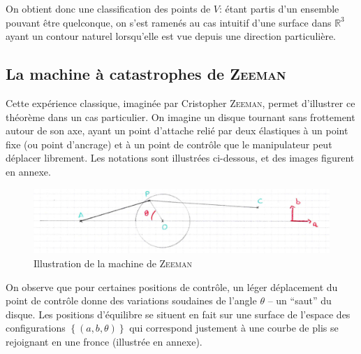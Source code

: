 \documentclass[a4paper]{article}
\newcommand{\R}{\mathbb{R}}
\theoremstyle{definition}
\begin{document}
On obtient donc une classification des points de $V$: étant partis d'un ensemble pouvant être quelconque, on s'est ramenés au cas intuitif d'une surface dans $\R^3$ ayant un contour naturel lorsqu'elle est vue depuis une direction particulière.

\subsection{La machine à catastrophes de \textsc{Zeeman}}
Cette expérience classique, imaginée par Cristopher \textsc{Zeeman}, permet d'illustrer ce théorème dans un cas particulier.
On imagine un disque tournant sans frottement autour de son axe, ayant un point d'attache relié par deux élastiques à un point fixe (ou point d'ancrage) et à un point de contrôle que le manipulateur peut déplacer librement.
Les notations sont illustrées ci-dessous, et des images figurent en annexe.

\begin{figure}[H]\centering \includegraphics[width=14cm, keepaspectratio]{images/zeeman_sketch.jpg}\caption{Illustration de la machine de \textsc{Zeeman}}\end{figure}

On observe que pour certaines positions de contrôle, un léger déplacement du point de contrôle donne des variations soudaines de l'angle $\theta$ -- un ``saut'' du disque.
Les positions d'équilibre se situent en fait sur une surface de l'espace des configurations $\left\{(a,b,\theta)\right\}$ qui correspond justement à une courbe de plis se rejoignant en une fronce (illustrée en annexe).
\end{document}
